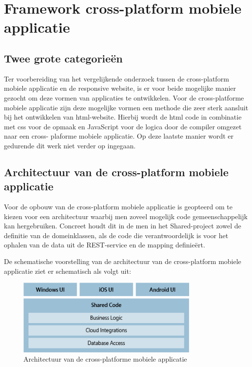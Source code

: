 \chapter{Framework cross-platform mobiele applicatie}
\label{ch:frameworkcrossplatformapp}
\section{Twee grote categorieën}
Ter voorbereiding van het vergelijkende onderzoek tussen de cross-platform mobiele applicatie en de
responsive website, is er voor beide mogelijke manier gezocht om deze vormen van applicaties te ontwikkelen. Voor de cross-platforme
mobiele applicatie zijn deze mogelijke vormen een methode die zeer sterk aansluit bij het ontwikkelen van html-website.
Hierbij wordt de html code in combinatie met css voor de opmaak en JavaScript voor de logica door de compiler omgezet naar een cross-
plaforme mobiele applicatie. Op deze laatste manier wordt er gedurende dit werk niet verder op ingegaan.

\label{sec:architectuurvandecrossplatformemobieleapplicatie}
\section{Architectuur van de cross-platform mobiele applicatie}
Voor de opbouw van de cross-platform mobiele applicatie is geopteerd om te kiezen voor een architectuur waarbij men zoveel mogelijk
code gemeenschappelijk kan hergebruiken. Concreet houdt dit in de men in het Shared-project zowel de definitie van de domeinklassen,
als de code die verantwoordelijk is voor het ophalen van de data uit de REST-service en de mapping definieërt.

De schematische voorstelling van de architectuur van de cross-platform mobiele applicatie ziet er schematisch als volgt uit:
\begin{figure}[ht!]
\centering
\caption{Architectuur van de cross-platforme mobiele applicatie \cite{joshholmes2017}}
\includegraphics[width=90mm]{./img/architecture.png}
\end{figure}

